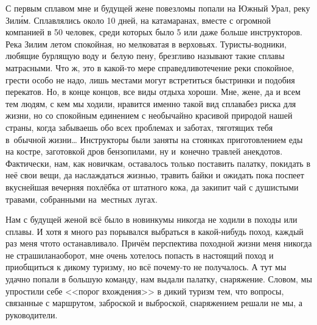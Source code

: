 С первым сплавом мне и будущей жене повезло\mdash мы попали на Южный Урал, реку Зил\'{и}м. Сплавлялись около 10 дней, на катамаранах, вместе с огромной компанией в 50 человек, среди которых было 5 или даже больше инструкторов. Река Зилим летом спокойная, но мелковатая в верховьях. Туристы-водники, любящие бурлящую воду и~белую пену, брезгливо называют такие сплавы матрасными. Что ж, это в какой-то мере справедливо\mdash течение реки спокойное, грести особо не надо, лишь местами могут встретиться быстринки и подобия перекатов. Но, в конце концов, все виды отдыха хороши. Мне, жене, да и всем тем людям, с кем мы ходили, нравится именно такой вид сплава\mdash без риска для жизни, но со спокойным единением с необычайно красивой природой нашей страны, когда забываешь обо всех проблемах и заботах, тяготящих тебя в~обычной жизни\ldots
\newpage
Инструкторы были заняты на стоянках приготовлением еды на костре, заготовкой дров бензопилами, ну и~конечно травлей анекдотов. Фактически, нам, как новичкам, оставалось только поставить палатку, покидать в неё свои вещи, да наслаждаться жизнью, травить байки и ожидать пока поспеет вкуснейшая вечерняя похлёбка от штатного кока, да закипит чай с душистыми травами, собранными на~местных лугах. 

Нам с будущей женой всё было в новинку\mdash мы никогда не ходили в походы или сплавы. И хотя я много раз порывался выбраться в какой-нибудь поход, каждый раз меня что\sdash то останавливало. Причём перспектива походной жизни меня никогда не страшила\mdash наоборот, мне очень хотелось попасть в настоящий поход и приобщиться к дикому туризму, но всё почему-то не получалось. А тут мы удачно попали в большую команду, нам выдали палатку, снаряжение. Словом, мы упростили себе <<порог вхождения>> в дикий туризм тем, что вопросы, связанные с маршрутом, заброской и выброской, снаряжением решали не мы, а руководители.

